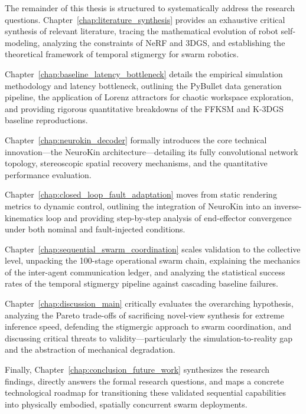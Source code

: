 \documentclass[12pt,a4paper,oneside]{report}
\begin{document}
The remainder of this thesis is structured to systematically address the research questions. Chapter~\ref{chap:literature_synthesis} provides an exhaustive critical synthesis of relevant literature, tracing the mathematical evolution of robot self-modeling, analyzing the constraints of NeRF and 3DGS, and establishing the theoretical framework of temporal stigmergy for swarm robotics.

Chapter~\ref{chap:baseline_latency_bottleneck} details the empirical simulation methodology and latency bottleneck, outlining the PyBullet data generation pipeline, the application of Lorenz attractors for chaotic workspace exploration, and providing rigorous quantitative breakdowns of the FFKSM and K-3DGS baseline reproductions.

Chapter~\ref{chap:neurokin_decoder} formally introduces the core technical innovation—the NeuroKin architecture—detailing its fully convolutional network topology, stereoscopic spatial recovery mechanisms, and the quantitative performance evaluation.

Chapter~\ref{chap:closed_loop_fault_adaptation} moves from static rendering metrics to dynamic control, outlining the integration of NeuroKin into an inverse-kinematics loop and providing step-by-step analysis of end-effector convergence under both nominal and fault-injected conditions.

Chapter~\ref{chap:sequential_swarm_coordination} scales validation to the collective level, unpacking the 100-stage operational swarm chain, explaining the mechanics of the inter-agent communication ledger, and analyzing the statistical success rates of the temporal stigmergy pipeline against cascading baseline failures.

Chapter~\ref{chap:discussion_main} critically evaluates the overarching hypothesis, analyzing the Pareto trade-offs of sacrificing novel-view synthesis for extreme inference speed, defending the stigmergic approach to swarm coordination, and discussing critical threats to validity—particularly the simulation-to-reality gap and the abstraction of mechanical degradation.

Finally, Chapter~\ref{chap:conclusion_future_work} synthesizes the research findings, directly answers the formal research questions, and maps a concrete technological roadmap for transitioning these validated sequential capabilities into physically embodied, spatially concurrent swarm deployments.

\clearpage

\end{document}
